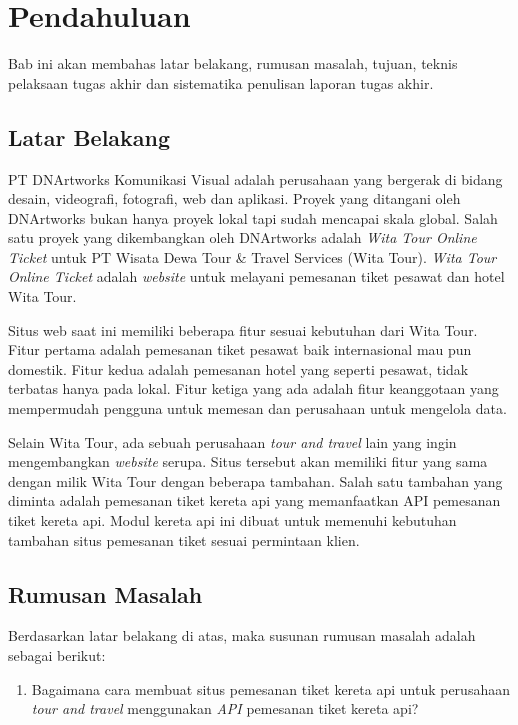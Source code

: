 \chapter{Pendahuluan}
\label{chap:intro}

Bab ini akan membahas latar belakang, rumusan masalah, tujuan, teknis pelaksaan tugas akhir dan sistematika penulisan laporan tugas akhir.
   
\section{Latar Belakang}
\label{sec:latarbelakang}

PT DNArtworks Komunikasi Visual adalah perusahaan yang bergerak di bidang desain, videografi, fotografi, web dan aplikasi. Proyek yang ditangani oleh DNArtworks bukan hanya proyek lokal tapi sudah mencapai skala global. Salah satu proyek yang dikembangkan oleh DNArtworks adalah \textit{Wita Tour Online Ticket} untuk PT Wisata Dewa Tour \& Travel Services (Wita Tour). \textit{Wita Tour Online Ticket} adalah \textit{website} untuk melayani pemesanan tiket pesawat dan hotel Wita Tour.

Situs web saat ini memiliki beberapa fitur sesuai kebutuhan dari Wita Tour. Fitur pertama adalah pemesanan tiket pesawat baik internasional mau pun domestik. Fitur kedua adalah pemesanan hotel yang seperti pesawat, tidak terbatas hanya pada lokal. Fitur ketiga yang ada adalah fitur keanggotaan yang mempermudah pengguna untuk memesan dan perusahaan untuk mengelola data.

Selain Wita Tour, ada sebuah perusahaan \textit{tour and travel} lain yang ingin mengembangkan \textit{website} serupa. Situs tersebut akan memiliki fitur yang sama dengan milik Wita Tour dengan beberapa tambahan. Salah satu tambahan yang diminta adalah pemesanan tiket kereta api yang memanfaatkan API pemesanan tiket kereta api. Modul kereta api ini dibuat untuk memenuhi kebutuhan tambahan situs pemesanan tiket sesuai permintaan klien.


\section{Rumusan Masalah}
\label{sec:rumusan}
Berdasarkan latar belakang di atas, maka susunan rumusan masalah adalah sebagai berikut:

\begin{enumerate}
	\item Bagaimana cara membuat situs pemesanan tiket kereta api untuk perusahaan \textit{tour and travel} menggunakan \textit{API} pemesanan tiket kereta api?

\end{enumerate}


